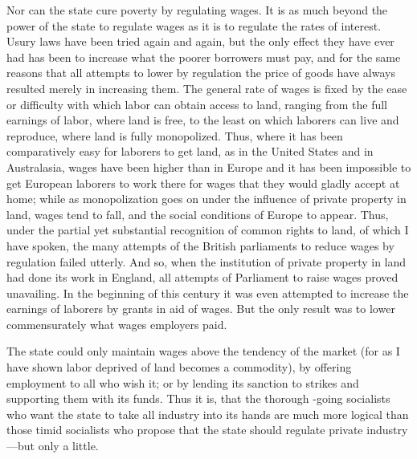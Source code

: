 \documentclass{book}
\begin{document}
Nor can the state cure poverty by regulating wages. It is as much beyond the power of the state to regulate wages as it is to regulate the rates of interest. Usury laws have been tried again and again, but the only effect they have ever had has been to increase what the poorer borrowers must pay, and for the same reasons that all attempts to lower by regulation the price of goods have always resulted merely in increasing them. The general rate of wages is fixed by the ease or difficulty with which labor can obtain access to land, ranging from the full earnings of labor, where land is free, to the least on which laborers can live and reproduce, where land is fully monopolized. Thus, where it has been comparatively easy for laborers to get land, as in the United States and in Australasia, wages have been higher than in Europe and it has been impossible to get European laborers to work there for wages that they would gladly accept at home; while as monopolization goes on under the influence of private property in land, wages tend to fall, and the social conditions of Europe to appear. Thus, under the partial yet substantial recognition of common rights to land, of which I have spoken, the many attempts of the British parliaments to reduce wages by regulation failed utterly. And so, when the institution of private property in land had done its work in England, all attempts of Parliament to raise wages proved unavailing. In the beginning of this century it was even attempted to increase the earnings of laborers by grants in aid of wages. But the only result was to lower commensurately what wages employers paid.

The state could only maintain wages above the tendency of the market (for as I have shown labor deprived of land becomes a commodity), by offering employment to all who wish it; or by lending its sanction to strikes and supporting them with its funds. Thus it is, that the thorough -going socialists who want the state to take all industry into its hands are much more logical than those timid socialists who propose that the state should regulate private industry—but only a little.
\end{document}
